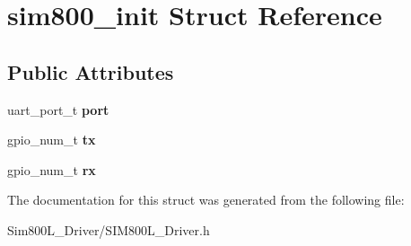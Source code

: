 \hypertarget{structsim800__init}{}\section{sim800\+\_\+init Struct Reference}
\label{structsim800__init}
\subsection*{Public Attributes}
\begin{DoxyCompactItemize}
\item 
\mbox{\label{structsim800__init_a5c7eab722aeb88a93b05ddd8c162431f}} 
uart\+\_\+port\+\_\+t {\bfseries port}
\item 
\mbox{\label{structsim800__init_a01e1cb1d91adbe63ed30578c0e12f529}} 
gpio\+\_\+num\+\_\+t {\bfseries tx}
\item 
\mbox{\label{structsim800__init_a2e1082415bb5e54ff5c5e6bb6d7bc31c}} 
gpio\+\_\+num\+\_\+t {\bfseries rx}
\end{DoxyCompactItemize}


The documentation for this struct was generated from the following file\+:\begin{DoxyCompactItemize}
\item 
Sim800\+L\+\_\+\+Driver/S\+I\+M800\+L\+\_\+\+Driver.\+h\end{DoxyCompactItemize}
